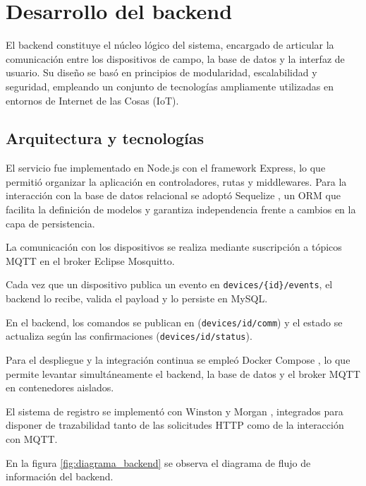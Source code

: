 \section{Desarrollo del backend}

El backend constituye el núcleo lógico del sistema, encargado de articular la comunicación entre los dispositivos de campo, la base de datos y la interfaz de usuario. Su diseño se basó en principios de modularidad, escalabilidad y seguridad, empleando un conjunto de tecnologías ampliamente utilizadas en entornos de Internet de las Cosas (IoT).


\subsection{Arquitectura y tecnologías}

El servicio fue implementado en Node.js con el framework Express, lo que permitió organizar la aplicación en controladores, rutas y middlewares. Para la interacción con la base de datos relacional se adoptó Sequelize \cite{sequelize}, un ORM \cite{fowler2002patterns} que facilita la definición de modelos y garantiza independencia frente a cambios en la capa de persistencia.

La comunicación con los dispositivos se realiza mediante suscripción a tópicos MQTT en el broker Eclipse Mosquitto. 

Cada vez que un dispositivo publica un evento en \texttt{devices/\{id\}/events}, 
el backend lo recibe, valida el payload y lo persiste en MySQL.
 
En el backend, los comandos se publican en (\texttt{devices/{id}/comm}) y el estado se actualiza según las confirmaciones (\texttt{devices/{id}/status}). 

Para el despliegue y la integración continua se empleó Docker Compose \cite{docker_compose}, lo que permite levantar simultáneamente el backend, la base de datos y el broker MQTT \cite{mqttSpec} en contenedores aislados.

El sistema de registro se implementó con Winston  \cite{winston} y Morgan \cite{morgan}, integrados para disponer de trazabilidad tanto de las solicitudes HTTP como de la interacción con MQTT.

En la figura \ref{fig:diagrama_backend} se observa el diagrama de flujo de información del backend.


